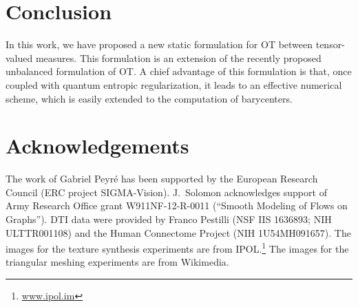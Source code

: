 
\section{Conclusion}

In this work, we have proposed a new static formulation for OT between tensor-valued measures. This formulation is an extension of the recently proposed unbalanced formulation of OT. A chief advantage of this formulation is that, once coupled with quantum entropic regularization, it leads to an effective numerical scheme, which is easily extended to the computation of barycenters. 

\section*{Acknowledgements}

The work of Gabriel Peyr\'e has been supported by the European Research Council (ERC project SIGMA-Vision). 
%
J.\ Solomon acknowledges support of Army Research Office grant W911NF-12-R-0011 (``Smooth Modeling of Flows on Graphs'').
%
DTI data were provided by Franco Pestilli (NSF IIS 1636893; NIH ULTTR001108) and the Human Connectome Project (NIH 1U54MH091657). 
%
The images for the texture synthesis experiments are from IPOL.\footnote{\url{www.ipol.im}}
% 
The images for the triangular meshing experiments are from Wikimedia.
